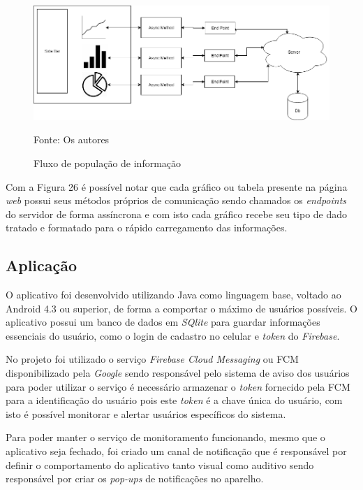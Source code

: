  \begin{figure}[H]

\begin{center}
     \caption{Fluxo de população de informação }
  \includegraphics[width=150mm]{images/Cap4/cap_4_servidor.png}
\end{center}
 \scriptsize Fonte: Os autores
  
\end{figure}

Com a Figura 26 é possível notar que cada gráfico ou tabela presente na página \textit{web} possui seus métodos próprios de comunicação sendo chamados os \textit{endpoints} do servidor de forma assíncrona e com isto cada gráfico recebe seu tipo de dado tratado e formatado para o rápido carregamento das informações.

\subsection{\textbf{Aplicação}}

O aplicativo foi desenvolvido utilizando Java como linguagem base, voltado ao Android 4.3 ou superior, de forma a comportar o máximo de usuários possíveis. O aplicativo possui um banco de dados em \textit{SQlite} para guardar informações essenciais do usuário, como o login de cadastro no celular e \textit{token} do \textit{Firebase}.

No projeto foi utilizado o serviço \textit{Firebase Cloud Messaging} ou FCM disponibilizado pela \textit{Google} sendo  responsável pelo sistema de aviso dos usuários para poder utilizar o serviço é necessário armazenar o \textit{token} fornecido pela FCM para a identificação do usuário pois este \textit{token} é a chave única do usuário, com isto é possível monitorar e alertar usuários específicos do sistema.


Para poder manter o serviço de monitoramento funcionando, mesmo que o aplicativo seja fechado, foi criado um canal de notificação que é responsável por definir o comportamento do aplicativo tanto visual como auditivo sendo responsável por criar os \textit{pop-ups} de notificações no aparelho.


